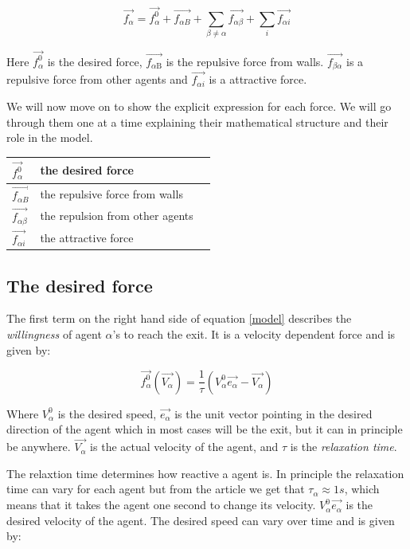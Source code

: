 \begin{equation}\label{model}
    \vec{f_{\alpha}} = \vec{f^{0}_{\alpha}} + \vec{f_{\alpha B}} +
    \sum_{\beta \neq \alpha} \vec{f_{\alpha \beta}} +  
    \sum_{i} \vec{f_{\alpha i}} 
\end{equation}

Here $\vec{f_{\alpha}^{0}}$ is the desired force, $\vec{f_{\alpha 
\text{B}}}$ is the repulsive force from walls. $\vec{f_{\beta\alpha}}$ 
is a repulsive force from other agents and $\vec{f_{\alpha i}}$ is a 
attractive force.

We will now move on to show the explicit expression for each force. We will go 
through them one at a time explaining their mathematical structure and their 
role in the model.

\begin{center}
\begin{tabular}{lll}
\hline
$\vec{f_{\alpha}^{0}}$ & the desired force &\\
\hline
$\vec{f_{\alpha B}}$ & the repulsive force from walls &\\
\hline
$\vec{f_{\alpha \beta}}$ & the repulsion from other agents\\
\hline
$\vec{f_{\alpha i}}$& the attractive force\\
\hline
\end{tabular}
\end{center}

\subsection{The desired force}
The first term on the right hand side of equation \eqref{model} describes the 
\emph{willingness} of agent $\alpha$'s to reach the exit. It is a velocity 
dependent force and is given by:

\begin{equation}\label{relaxtime}
	\vec{f^{0}_{\alpha}}\left( \vec{V_{\alpha}} \right) =
    \frac{1}{\tau}
    \left( V_{\alpha}^{0} \vec{e_{\alpha}} - \vec{V_{\alpha}} \right)
\end{equation}

Where $V_{\alpha}^{0}$ is the desired speed, $ \vec{e_{\alpha}} $ is the unit 
vector pointing in the desired direction of the agent which in most cases will 
be the exit, but it can in principle be anywhere.  $\vec{V_{\alpha}}$ is the 
actual velocity of the agent, and $\tau$ is the \emph{relaxation time}.

The relaxtion time determines how reactive a agent is. In principle the 
relaxation time can vary for each agent but from the article \cite{self-org} 
we get that $ \tau_{\alpha}\approx 1s $, which means that it takes the agent 
one second to change its velocity. $V_{\alpha}^{0} \vec{e_{\alpha}}$ is the desired 
velocity of the agent. The desired speed can vary over time and is given by:

